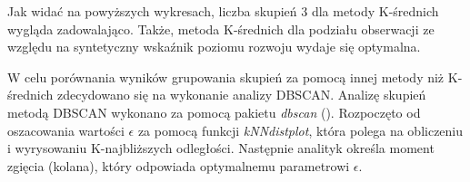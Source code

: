 \documentclass{amuthesis}
\begin{document}
Jak widać na powyższych wykresach, liczba skupień 3 dla metody K-średnich wygląda zadowalająco. Także, metoda K-średnich dla podziału obserwacji ze względu na syntetyczny wskaźnik poziomu rozwoju wydaje się optymalna.

W celu porównania wyników grupowania skupień za pomocą innej metody niż K-średnich zdecydowano się na wykonanie analizy DBSCAN. Analizę skupień metodą DBSCAN wykonano za pomocą pakietu \emph{dbscan} (\textcite{R-dbscan}).
Rozpoczęto od oszacowania wartości \(\epsilon\) za pomocą funkcji \emph{kNNdistplot}, która polega na obliczeniu i wyrysowaniu K-najbliższych odległości.
Następnie analityk określa moment zgięcia (kolana), który odpowiada optymalnemu parametrowi \(\epsilon\).

\begin{Shaded}
\begin{Highlighting}[]
\SpecialCharTok{::} \NormalTok{)}
\NormalTok{(} \NormalTok{, } \NormalTok{)}
\NormalTok{(}\NormalTok{)}
\OtherTok{\textless{}{-}}\SpecialCharTok{::} \NormalTok{, } \NormalTok{)}
\SpecialCharTok{::} \NormalTok{)}
\end{Highlighting}
\end{Shaded}
\end{document}
